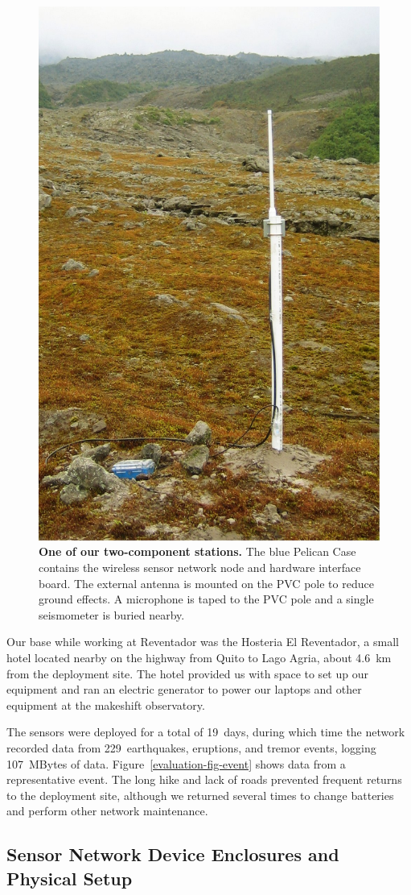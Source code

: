 \begin{figure}[t]
\begin{center}
\includegraphics[width=0.5\hsize]{./3-evaluation/figs/station.pdf}
\end{center}
\caption{\textbf{One of our two-component stations.} The blue Pelican Case
contains the wireless sensor network node and hardware interface board. The
external antenna is mounted on the PVC pole to reduce ground effects. A
microphone is taped to the PVC pole and a single seismometer is buried
nearby.}
\label{evaluation-fig-station}
\end{figure}

Our base while working at Reventador was the Hosteria El Reventador, a small
hotel located nearby on the highway from Quito to Lago Agria, about 4.6~km
from the deployment site. The hotel provided us with space to set up our
equipment and ran an electric generator to power our laptops and other
equipment at the makeshift observatory.

The sensors were deployed for a total of 19~days, during which time the
network recorded data from 229~earthquakes, eruptions, and tremor events,
logging 107~MBytes of data. Figure~\ref{evaluation-fig-event} shows data from
a representative event. The long hike and lack of roads prevented frequent
returns to the deployment site, although we returned several times to change
batteries and perform other network maintenance.

\subsection{Sensor Network Device Enclosures and Physical Setup}

